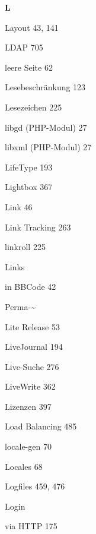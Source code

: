 \documentclass{book}
\renewcommand\indexspace{\vspace{11pt}}
\renewcommand\subitem{\par}
\begin{document}
\begin{multicols}{2}
\begin{osp-index}
  \indexspace
{\sffamily\bfseries L}\nopagebreak

  \item Layout\hspace{1mm} 43, 141
  \item LDAP\hspace{1mm} 705
  \item leere Seite\hspace{1mm} 62
  \item Lesebeschr\"ankung\hspace{1mm} 123
  \item Lesezeichen\hspace{1mm} 225
  \item libgd (PHP-Modul)\hspace{1mm} 27
  \item libxml (PHP-Modul)\hspace{1mm} 27
  \item LifeType\hspace{1mm} 193
  \item Lightbox\hspace{1mm} 367
  \item Link\hspace{1mm} 46
  \item Link Tracking\hspace{1mm} 263
  \item linkroll\hspace{1mm} 225
  \item Links
    \subitem in BBCode\hspace{1mm} 42
    \subitem Perma-\textasciitilde\hspace{1mm} 
  \item Lite Release\hspace{1mm} 53
  \item LiveJournal\hspace{1mm} 194
  \item Live-Suche\hspace{1mm} 276
  \item LiveWrite\hspace{1mm} 362
  \item Lizenzen\hspace{1mm} 397
  \item Load Balancing\hspace{1mm} 485
  \item locale-gen\hspace{1mm} 70
  \item Locales\hspace{1mm} 68
  \item Logfiles\hspace{1mm} 459, 476
  \item Login
    \subitem via HTTP\hspace{1mm} 175


\end{osp-index}
\end{multicols}
\end{document}
